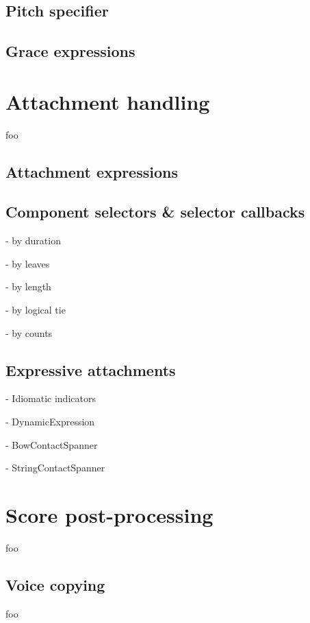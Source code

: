 \subsection{Pitch specifier}

\subsection{Grace expressions}

\section{Attachment handling}

foo

\subsection{Attachment expressions}

\subsection{Component selectors \& selector callbacks}

- by duration

- by leaves

- by length

- by logical tie

- by counts

\subsection{Expressive attachments}

- Idiomatic indicators

- DynamicExpression

- BowContactSpanner

- StringContactSpanner

\section{Score post-processing}

foo

\subsection{Voice copying}

foo